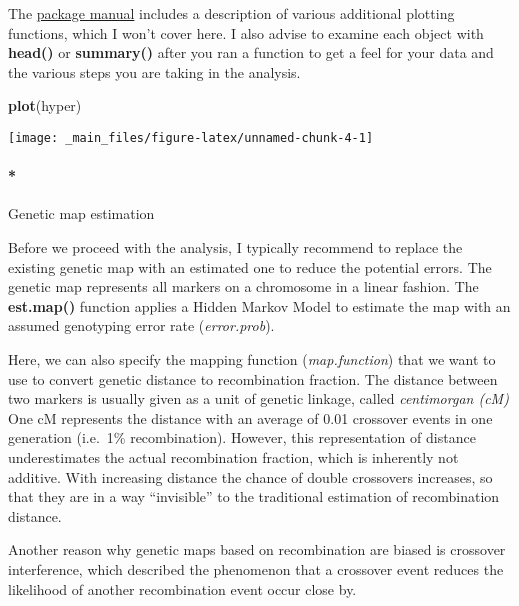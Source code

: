 \documentclass[12pt,]{book}
\newenvironment{Shaded}{\begin{snugshade}}{\end{snugshade}}
\newcommand{\KeywordTok}[1]{\textcolor[rgb]{0.27,0.27,0.27}{\textbf{{#1}}}}
\newcommand{\NormalTok}[1]{{#1}}
\let\oldparagraph\paragraph
\renewcommand{\paragraph}[1]{\oldparagraph{#1}\mbox{}}
\begin{document}
The \href{http://www.rqtl.org/tutorials/rqtltour.pdf}{package manual}
includes a description of various additional plotting functions, which I
won't cover here. I also advise to examine each object with
\textbf{head()} or \textbf{summary()} after you ran a function to get a
feel for your data and the various steps you are taking in the analysis.

\begin{Shaded}
\begin{Highlighting}[]
\KeywordTok{plot}\NormalTok{(hyper)}
\end{Highlighting}
\end{Shaded}

\begin{center}\texttt{[image: \_main\_files/figure-latex/unnamed-chunk-4-1]} \end{center}

\paragraph*{Genetic map estimation}\label{genetic-map-estimation}

Before we proceed with the analysis, I typically recommend to replace
the existing genetic map with an estimated one to reduce the potential
errors. The genetic map represents all markers on a chromosome in a
linear fashion. The \textbf{est.map()} function applies a Hidden Markov
Model \citep{Lander01041987} to estimate the map with an assumed
genotyping error rate (\emph{error.prob}).

Here, we can also specify the mapping function (\emph{map.function})
that we want to use to convert genetic distance to recombination
fraction. The distance between two markers is usually given as a unit of
genetic linkage, called \emph{centimorgan (cM)} One cM represents the
distance with an average of 0.01 crossover events in one generation
(i.e.~1\% recombination). However, this representation of distance
underestimates the actual recombination fraction, which is inherently
not additive. With increasing distance the chance of double crossovers
increases, so that they are in a way ``invisible'' to the traditional
estimation of recombination distance.

Another reason why genetic maps based on recombination are biased is
crossover interference, which described the phenomenon that a crossover
event reduces the likelihood of another recombination event occur close
by.
\end{document}
